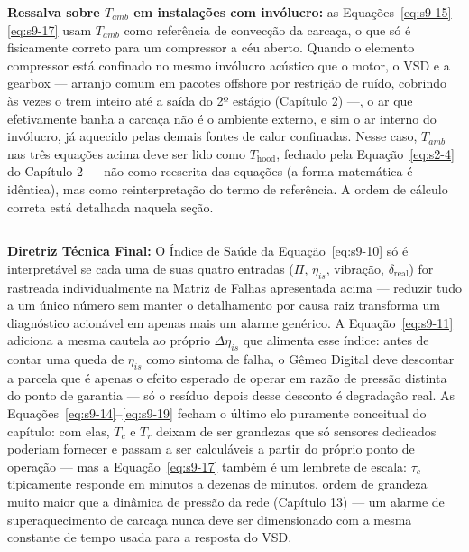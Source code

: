 \documentclass[12pt,a4paper]{article}
\numberwithin{equation}{section}
\numberwithin{table}{section}
\numberwithin{figure}{section}
\begin{document}
{	\textbf{Ressalva sobre $T_{amb}$ em instalações com invólucro:} as Equações~\eqref{eq:s9-15}--\eqref{eq:s9-17} usam $T_{amb}$ como referência de convecção da carcaça, o que só é fisicamente correto para um compressor a céu aberto. Quando o elemento compressor está confinado no mesmo invólucro acústico que o motor, o VSD e a gearbox — arranjo comum em pacotes offshore por restrição de ruído, cobrindo às vezes o trem inteiro até a saída do 2º estágio (Capítulo 2) —, o ar que efetivamente banha a carcaça não é o ambiente externo, e sim o ar interno do invólucro, já aquecido pelas demais fontes de calor confinadas. Nesse caso, $T_{amb}$ nas três equações acima deve ser lido como $T_{\text{hood}}$, fechado pela Equação~\eqref{eq:s2-4} do Capítulo 2 — não como reescrita das equações (a forma matemática é idêntica), mas como reinterpretação do termo de referência. A ordem de cálculo correta está detalhada naquela seção.

	\vspace{1em}
	\hrule
	\vspace{1em}

	\textbf{Diretriz Técnica Final:} O Índice de Saúde da Equação~\eqref{eq:s9-10} só é interpretável se cada uma de suas quatro entradas ($\Pi$, $\eta_{is}$, vibração, $\delta_{\text{real}}$) for rastreada individualmente na Matriz de Falhas apresentada acima — reduzir tudo a um único número sem manter o detalhamento por causa raiz transforma um diagnóstico acionável em apenas mais um alarme genérico. A Equação~\eqref{eq:s9-11} adiciona a mesma cautela ao próprio $\Delta\eta_{is}$ que alimenta esse índice: antes de contar uma queda de $\eta_{is}$ como sintoma de falha, o Gêmeo Digital deve descontar a parcela que é apenas o efeito esperado de operar em razão de pressão distinta do ponto de garantia — só o resíduo depois desse desconto é degradação real. As Equações~\eqref{eq:s9-14}--\eqref{eq:s9-19} fecham o último elo puramente conceitual do capítulo: com elas, $T_c$ e $T_r$ deixam de ser grandezas que só sensores dedicados poderiam fornecer e passam a ser calculáveis a partir do próprio ponto de operação — mas a Equação~\eqref{eq:s9-17} também é um lembrete de escala: $\tau_c$ tipicamente responde em minutos a dezenas de minutos, ordem de grandeza muito maior que a dinâmica de pressão da rede (Capítulo 13) — um alarme de superaquecimento de carcaça nunca deve ser dimensionado com a mesma constante de tempo usada para a resposta do VSD.

	
	
}
\end{document}
